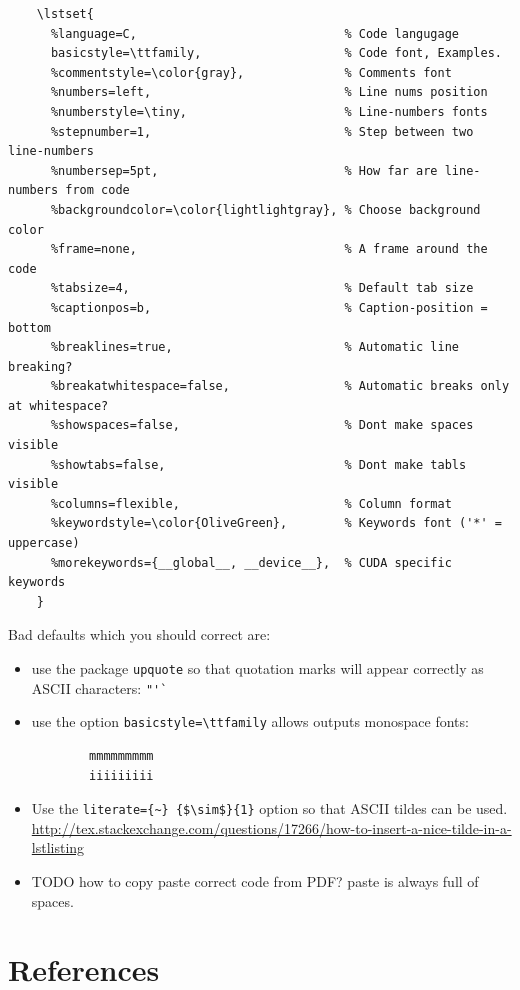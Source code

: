 \documentclass[12pt]{article}
\begin{document}
  \begin{lstlisting}
    \lstset{
      %language=C,                             % Code langugage
      basicstyle=\ttfamily,                    % Code font, Examples.
      %commentstyle=\color{gray},              % Comments font
      %numbers=left,                           % Line nums position
      %numberstyle=\tiny,                      % Line-numbers fonts
      %stepnumber=1,                           % Step between two line-numbers
      %numbersep=5pt,                          % How far are line-numbers from code
      %backgroundcolor=\color{lightlightgray}, % Choose background color
      %frame=none,                             % A frame around the code
      %tabsize=4,                              % Default tab size
      %captionpos=b,                           % Caption-position = bottom
      %breaklines=true,                        % Automatic line breaking?
      %breakatwhitespace=false,                % Automatic breaks only at whitespace?
      %showspaces=false,                       % Dont make spaces visible
      %showtabs=false,                         % Dont make tabls visible
      %columns=flexible,                       % Column format
      %keywordstyle=\color{OliveGreen},        % Keywords font ('*' = uppercase)
      %morekeywords={__global__, __device__},  % CUDA specific keywords
    }
  \end{lstlisting}

  Bad defaults which you should correct are:

  \begin{itemize}
    \item use the package \lstinline|upquote| so that quotation marks will appear
      correctly as ASCII characters: \lstinline|"'`|
    \item use the option \lstinline|basicstyle=\ttfamily| allows outputs monospace fonts:
      \begin{lstlisting}
        mmmmmmmmm
        iiiiiiiii
      \end{lstlisting}
    \item Use the \lstinline|literate={~} {$\sim$}{1}| option so that ASCII tildes can be used.
      \url{http://tex.stackexchange.com/questions/17266/how-to-insert-a-nice-tilde-in-a-lstlisting}
    \item TODO how to copy paste correct code from PDF? paste is always full of spaces.
  \end{itemize}

\section{References}\label{references}
\end{document}
